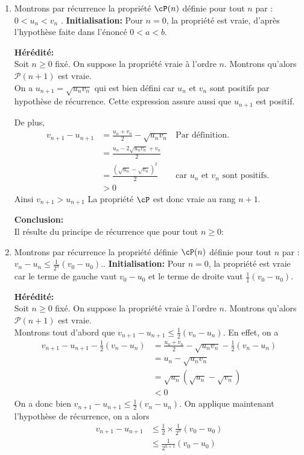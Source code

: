 \documentclass[a4paper, 11pt,reqno]{article}
\begin{document}
\begin{correction}
\begin{enumerate}
\item Montrons par récurrence la propriété $\cP(n)$ définie pour tout $n$ par : \og $  0<u_n<v_n$ \fg. 
\textbf{Initialisation:}  Pour $n=0$, la propriété est vraie, d'après l'hypothèse faite dans l'énoncé  $0<a<b.$ 

 \textbf{H\'er\'edit\'e:}\\
Soit $n\geq 0$ fix\'e. On suppose la propri\'et\'e vraie \`a l'ordre $n$. Montrons qu'alors $\mathcal{P}(n+1)$ est vraie.\\
On a $u_{n+1} = \sqrt{u_n v_n}$ qui est bien défini car $u_n $ et $v_n$ sont positifs par hypothèse de récurrence. Cette expression assure aussi que $u_{n+1}$ est positif. 

De plus, 
\begin{align*}
v_{n+1}-u_{n+1} &= \frac{u_n +v_n}{2} - \sqrt{u_n v_n}&  \text{Par définition. }\\
						&= \frac{u_n -2 \sqrt{u_nv_n}+v_n}{2} \\
						&= \frac{(\sqrt{u_n} -\sqrt{v_n})^2}{2} 			&  \text{car $u_n$ et   $v_n$ sont positifs. }\\	
						&>0
\end{align*} 
Ainsi $v_{n+1} > u_{n+1}$
La propriété $\cP$ est donc vraie au rang $n+1$.

\textbf{Conclusion:}\\
Il r\'esulte du principe de r\'ecurrence que pour tout $ n\geq 0$:
\begin{center}
\end{center}

\item 
Montrons par récurrence la propriété définie $\cP(n)$ définie pour tout $n$ par : \og $  v_n-u_n\leq \frac{1}{2^n}(v_0-u_0).$\fg. 
\textbf{Initialisation:}  Pour $n=0$, la propriété est vraie car le terme de gauche vaut $v_0-u_0$ et le terme de droite vaut $\frac{1}{1}(v_0-u_0)$. 

 \textbf{H\'er\'edit\'e:}\\
Soit $n\geq 0$ fix\'e. On suppose la propri\'et\'e vraie \`a l'ordre $n$. Montrons qu'alors $\mathcal{P}(n+1)$ est vraie.\\
Montrons tout d'abord que $v_{n+1}-u_{n+1} \leq \frac{1}{2} (v_n -u_n)$. 
En effet, on a 
\begin{align*}
v_{n+1}-u_{n+1} -\frac{1}{2} (v_n -u_n)&= \frac{u_n +v_n}{2} - \sqrt{u_n v_n}  -\frac{1}{2} (v_n -u_n)\\
															&=u_n - \sqrt{u_n v_n}\\
															&=\sqrt{u_n}(\sqrt{u_n} - \sqrt{ v_n})\\
															&<0															
\end{align*}
On a donc bien $v_{n+1}-u_{n+1} \leq \frac{1}{2} (v_n -u_n)$. On applique maintenant l'hypothèse de récurrence, on a alors 
\begin{align*}
v_{n+1}-u_{n+1} & \leq \frac{1}{2} \times \frac{1}{2^n}(v_0-u_0)\\
						 & \leq \frac{1}{2^{n+1}}(v_0-u_0)				
\end{align*}


\end{enumerate}
\end{correction}
\end{document}
